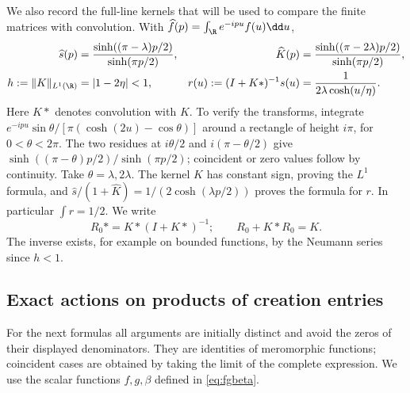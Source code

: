 We also record the full-line kernels that will be used to compare the
finite matrices with convolution.  With
$\widehat f(p)=\int_{\R}e^{-ipu}f(u)\dd u$,
\begin{align}
 \widehat s(p)&=\frac{\sinh((\pi-\lambda)p/2)}{\sinh(\pi p/2)},&
 \widehat K(p)&=\frac{\sinh((\pi-2\lambda)p/2)}{\sinh(\pi p/2)},
 \label{eq:kernel-transforms}\\
 h:=\|K\|_{L^1(\R)}&=|1-2\eta|<1,&
 r(u):=(I+K*)^{-1}s(u)&=\frac1{2\lambda\cosh(u/\eta)}.
 \label{eq:dressed-density}
\end{align}
Here $K*$ denotes convolution with $K$.  To verify the transforms,
integrate $e^{-ipu}\sin\theta/[\pi(\cosh(2u)-\cos\theta)]$ around a
rectangle of height $i\pi$, for $0<\theta<2\pi$.  The two residues at
$i\theta/2$ and $i(\pi-\theta/2)$ give
$\sinh((\pi-\theta)p/2)/\sinh(\pi p/2)$; coincident or zero values
follow by continuity.  Take $\theta=\lambda,2\lambda$.
The kernel $K$ has constant sign, proving the $L^1$ formula, and
$\widehat s/(1+\widehat K)=1/(2\cosh(\lambda p/2))$ proves the
formula for $r$.  In particular $\int r=1/2$.
We write
\begin{equation}\label{eq:full-line-resolvent}
 R_0*=K*(I+K*)^{-1};
 \qquad R_0+K*R_0=K.
\end{equation}
The inverse exists, for example on bounded functions, by the Neumann
series since $h<1$.

\subsection{Exact actions on products of creation entries}

For the next formulas all arguments are initially distinct and avoid
the zeros of their displayed denominators.  They are identities of
meromorphic functions; coincident cases are obtained by taking the
limit of the complete expression.  We use the scalar functions
$f,g,\beta$ defined in \eqref{eq:fgbeta}.

